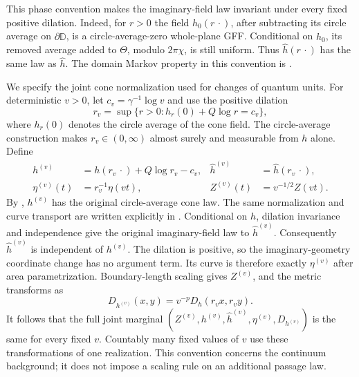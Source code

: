 This phase convention makes the imaginary-field law invariant
under every fixed positive dilation. Indeed, for $r>0$ the
field $\widehat h_0(r\,\cdot)$, after subtracting its circle
average on $\partial\mathbb D$, is a circle-average-zero
whole-plane GFF. Conditional on $\widehat h_0$, its removed
average added to $\Theta$, modulo $2\pi\chi$, is still uniform.
Thus $\widehat h(r\,\cdot)$ has the same law as $\widehat h$.
The domain Markov property in this convention is
\cite[Proposition~2.8]{MillerSheffieldIGIV}.

We specify the joint cone normalization used for changes of
quantum units. For deterministic $v>0$, let
$c_v=\gamma^{-1}\log v$ and use the positive dilation
\[
 r_v=\sup\{r>0:h_r(0)+Q\log r=c_v\},
\]
where $h_r(0)$ denotes the circle average of the cone field.
The circle-average construction makes $r_v\in(0,\infty)$
almost surely and measurable from $h$ alone. Define
\begin{equation}\label{tree:eq:background_joint_zoom}
 \begin{aligned}
  h^{(v)}&=h(r_v\,\cdot)+Q\log r_v-c_v,
  &\widehat h^{(v)}&=\widehat h(r_v\,\cdot),\\
  \eta^{(v)}(t)&=r_v^{-1}\eta(vt),
  &Z^{(v)}(t)&=v^{-1/2}Z(vt).
 \end{aligned}
\end{equation}
By \cite[Proposition~4.13(i)]{DMS}, $h^{(v)}$ has the original
circle-average cone law. The same normalization and curve
transport are written explicitly in
\cite[proof of Theorem~4.4]{GwynneMillerSheffieldHarmonic}.
Conditional on $h$, dilation invariance and independence give
the original imaginary-field law to $\widehat h^{(v)}$.
Consequently $\widehat h^{(v)}$ is independent of $h^{(v)}$.
The dilation is positive, so the imaginary-geometry coordinate
change has no argument term. Its curve is therefore exactly
$\eta^{(v)}$ after area parametrization. Boundary-length scaling
gives $Z^{(v)}$, and the metric transforms as
\[
 D_{h^{(v)}}(x,y)=v^{-p}D_h(r_vx,r_vy).
\]
It follows that the full joint marginal
$(Z^{(v)},h^{(v)},\widehat h^{(v)},\eta^{(v)},D_{h^{(v)}})$ is
the same for every fixed $v$. Countably many fixed values of $v$
use these transformations of one realization. This convention
concerns the continuum background; it does not impose a
scaling rule on an additional passage law.

